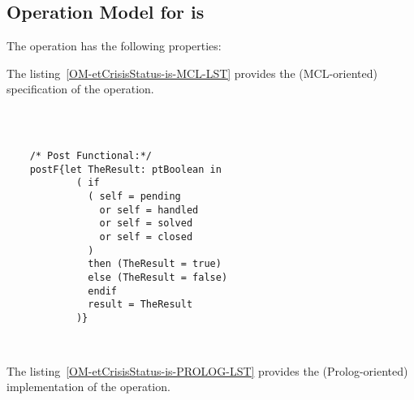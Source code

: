 \subsection{Operation Model for is}

\label{OM-is}


The  operation has the following properties:

	\begin{operationmodel}



		


	\end{operationmodel}



	\vspace{1cm}
	The listing~\ref{OM-etCrisisStatus-is-MCL-LST} provides the \msrmessir (MCL-oriented) specification of the operation.
	
	\scriptsize
	\vspace{0.5cm}
	\begin{lstlisting}[style=MessirStyle,firstnumber=auto,captionpos=b,caption={\msrmessir (MCL-oriented) specification of the operation \emph{is}.},label=OM-etCrisisStatus-is-MCL-LST]

	
	
	/* Post Functional:*/ 
	postF{let TheResult: ptBoolean in
	        ( if
	          ( self = pending
	            or self = handled
	            or self = solved
	            or self = closed
	          )
	          then (TheResult = true)
	          else (TheResult = false)
	          endif
	          result = TheResult
	        )}
	
	
	\end{lstlisting}
	\normalsize 
	
	
	
	
	
	\vspace{1cm}
	The listing~\ref{OM-etCrisisStatus-is-PROLOG-LST} provides the \msrmessir (Prolog-oriented) implementation of the operation.
	
	\scriptsize
	\vspace{0.5cm}
	
	
	\normalsize






